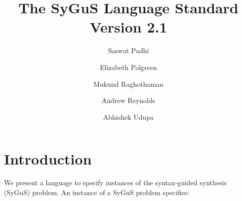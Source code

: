 \documentclass[english,a4paper,10pt]{article}
\begin{document}
\title{The SyGuS Language Standard Version 2.1}

\author{
  Saswat Padhi \and
  Elizabeth Polgreen \and
  Mukund Raghothaman \and
  Andrew Reynolds \and
  Abhishek Udupa
}

\maketitle




\section{Introduction}%
\label{sec:Introduction}

We present a language to specify instances of the syntax-guided synthesis
(SyGuS) problem. An instance of a SyGuS problem specifies:
\end{document}
